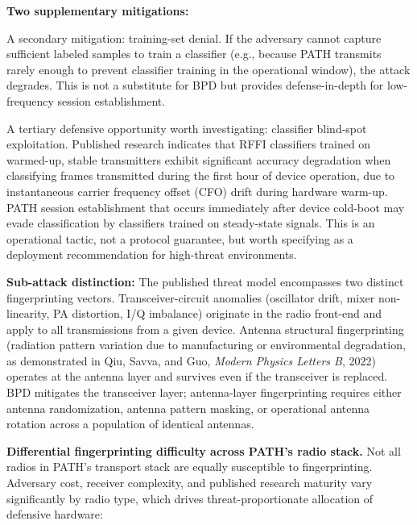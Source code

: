 \documentclass[
  11pt,
]{article}
\begin{document}
\textbf{Two supplementary mitigations:}

A secondary mitigation: training-set denial. If the adversary cannot
capture sufficient labeled samples to train a classifier (e.g., because
PATH transmits rarely enough to prevent classifier training in the
operational window), the attack degrades. This is not a substitute for
BPD but provides defense-in-depth for low-frequency session
establishment.

A tertiary defensive opportunity worth investigating: classifier
blind-spot exploitation. Published research indicates that RFFI
classifiers trained on warmed-up, stable transmitters exhibit
significant accuracy degradation when classifying frames transmitted
during the first hour of device operation, due to instantaneous carrier
frequency offset (CFO) drift during hardware warm-up. PATH session
establishment that occurs immediately after device cold-boot may evade
classification by classifiers trained on steady-state signals. This is
an operational tactic, not a protocol guarantee, but worth specifying as
a deployment recommendation for high-threat environments.

\textbf{Sub-attack distinction:} The published threat model encompasses
two distinct fingerprinting vectors. Transceiver-circuit anomalies
(oscillator drift, mixer non-linearity, PA distortion, I/Q imbalance)
originate in the radio front-end and apply to all transmissions from a
given device. Antenna structural fingerprinting (radiation pattern
variation due to manufacturing or environmental degradation, as
demonstrated in Qiu, Savva, and Guo, \emph{Modern Physics Letters B},
2022) operates at the antenna layer and survives even if the transceiver
is replaced. BPD mitigates the transceiver layer; antenna-layer
fingerprinting requires either antenna randomization, antenna pattern
masking, or operational antenna rotation across a population of
identical antennas.

\textbf{Differential fingerprinting difficulty across PATH's radio
stack.} Not all radios in PATH's transport stack are equally susceptible
to fingerprinting. Adversary cost, receiver complexity, and published
research maturity vary significantly by radio type, which drives
threat-proportionate allocation of defensive hardware:
\end{document}
